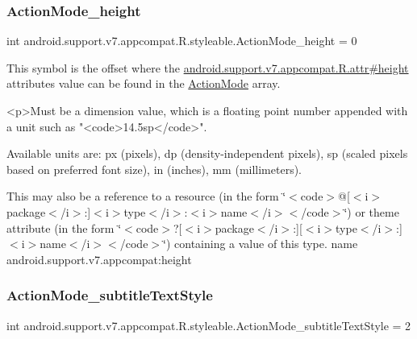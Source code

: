 \subsubsection{\texorpdfstring{Action\+Mode\+\_\+height}{ActionMode\_height}}
{\footnotesize\ttfamily int android.\+support.\+v7.\+appcompat.\+R.\+styleable.\+Action\+Mode\+\_\+height = 0\hspace{0.3cm}{\ttfamily [static]}}

This symbol is the offset where the \hyperlink{classandroid_1_1support_1_1v7_1_1appcompat_1_1R_1_1attr_ac0327a7cdb8d8e0b1c7726e150ba0576}{android.\+support.\+v7.\+appcompat.\+R.\+attr\#height} attribute\textquotesingle{}s value can be found in the \hyperlink{classandroid_1_1support_1_1v7_1_1appcompat_1_1R_1_1styleable_ac4197f1a9a85a8f5973cc5efa358ad9f}{Action\+Mode} array.

\begin{DoxyVerb}      <p>Must be a dimension value, which is a floating point number appended with a unit such as "<code>14.5sp</code>".
\end{DoxyVerb}
 Available units are\+: px (pixels), dp (density-\/independent pixels), sp (scaled pixels based on preferred font size), in (inches), mm (millimeters). 

This may also be a reference to a resource (in the form \char`\"{}$<$code$>$@\mbox{[}$<$i$>$package$<$/i$>$\+:\mbox{]}$<$i$>$type$<$/i$>$\+:$<$i$>$name$<$/i$>$$<$/code$>$\char`\"{}) or theme attribute (in the form \char`\"{}$<$code$>$?\mbox{[}$<$i$>$package$<$/i$>$\+:\mbox{]}\mbox{[}$<$i$>$type$<$/i$>$\+:\mbox{]}$<$i$>$name$<$/i$>$$<$/code$>$\char`\"{}) containing a value of this type.  name android.\+support.\+v7.\+appcompat\+:height \mbox{\label{classandroid_1_1support_1_1v7_1_1appcompat_1_1R_1_1styleable_a79b250cbfc7600ab0f0291cc59dc7bbd}} 
\subsubsection{\texorpdfstring{Action\+Mode\+\_\+subtitle\+Text\+Style}{ActionMode\_subtitleTextStyle}}
{\footnotesize\ttfamily int android.\+support.\+v7.\+appcompat.\+R.\+styleable.\+Action\+Mode\+\_\+subtitle\+Text\+Style = 2\hspace{0.3cm}{\ttfamily [static]}}

